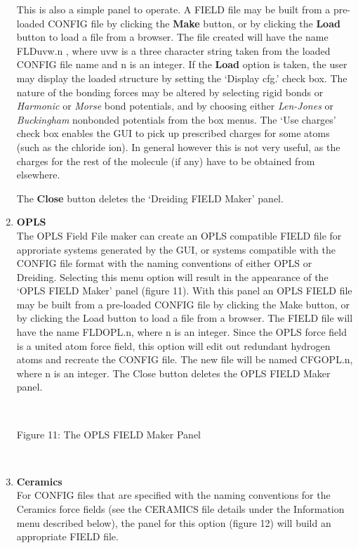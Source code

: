 \begin{enumerate}
\noindent
This is also a simple panel to operate. A FIELD file may be built from
a pre-loaded CONFIG file by clicking the {\bf Make} button, or by
clicking the {\bf Load} button to load a file from a browser. The file
created will have the name FLDuvw.n , where uvw is a three character
string taken from the loaded CONFIG file name and n is an integer. If
the {\bf Load} option is taken, the user may display the loaded
structure by setting the `Display cfg.' check box. The nature of the
bonding forces may be altered by selecting rigid bonds or {\em Harmonic} or
{\em Morse} bond potentials, and by choosing either {\em Len-Jones} or
{\em Buckingham} nonbonded potentials from the box menus. The `Use
charges' check box enables the GUI to pick up prescribed charges for
some atoms (such as the chloride ion). In general however this is not
very useful, as the charges for the rest of the molecule (if any) have
to be obtained from elsewhere. 

The {\bf Close} button deletes the `Dreiding FIELD Maker' panel.
\item {\bf OPLS}\\
The OPLS Field File maker can create an OPLS compatible FIELD file for
approriate systems generated by the GUI, or systems compatible with the CONFIG
file format with the naming conventions of either OPLS or Dreiding. Selecting
this menu option will result in the appearance of the `OPLS FIELD Maker' panel
(figure 11).
With this panel an OPLS FIELD file may be built from a pre-loaded CONFIG file
by clicking the Make button, or by clicking the Load button to load a file
from a browser. The FIELD file will have the name FLDOPL.n, where n is an
integer. Since the OPLS force field is a united atom force field, this option
will edit out redundant hydrogen atoms and recreate the CONFIG file. The new
file will be named CFGOPL.n, where n is an integer.
The Close button deletes the OPLS FIELD Maker panel.

~

\vskip 5mm
\centerline{}
\centerline{Figure 11: The OPLS FIELD Maker Panel}
\vskip 5mm

~



\item{\bf Ceramics}\\
For CONFIG files that are specified with the naming conventions for
the Ceramics force fields (see the CERAMICS file details under the
Information menu described below), the panel for this option (figure
12) will build an appropriate FIELD file.


\end{enumerate}
